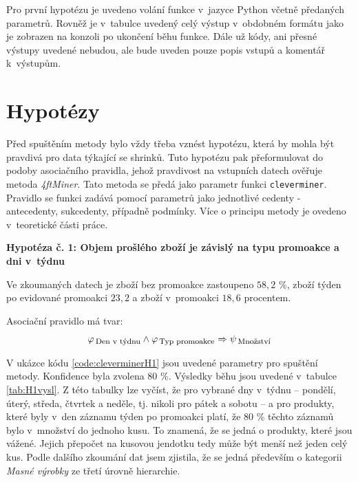 Pro první hypotézu je uvedeno volání funkce v~jazyce Python včetně předaných parametrů. Rovněž je v~tabulce uvedený celý výstup v~obdobném formátu jako je zobrazen na konzoli po ukončení běhu funkce. Dále už kódy, ani přesné výstupy uvedené nebudou, ale bude uveden pouze popis vstupů a komentář k~výstupům. 

\section{Hypotézy}

Před spuštěním metody bylo vždy třeba vznést hypotézu, která by mohla být pravdivá pro data týkající se shrinků. Tuto hypotézu pak přeformulovat do podoby asociačního pravidla, jehož pravdivost  na vstupních datech ověřuje metoda \emph{4ftMiner}. Tato metoda se předá jako parametr funkci \texttt{cleverminer}. Pravidlo se funkci zadává pomocí parametrů jako jednotlivé cedenty - antecedenty, sukcedenty, případně podmínky. Více o principu metody je ovedeno v~teoretické části práce.

\vspace*{1em}

\textbf{Hypotéza č. 1: Objem prošlého zboží je závislý na typu promoakce a dni v~týdnu}

Ve zkoumaných datech je zboží bez promoakce zastoupeno $58{,}2$ \%, zboží týden po evidované promoakci $23{,}2$ a zboží v~promoakci $18{,}6$ procentem. 

Asociační pravidlo má tvar:
\begin{equation}
    \varphi_{\mbox{\,\footnotesize Den v~týdnu}} \land \varphi_{\,\mbox{\footnotesize Typ promoakce}} \Rightarrow \psi_{\mbox{\,\footnotesize Množství}}
\end{equation}

V ukázce kódu \ref*{code:cleverminerH1} jsou uvedené parametry pro spuštění metody. Konfidence byla zvolena 80 \%. Výsledky běhu jsou uvedené v~tabulce \ref*{tab:H1vysl}. Z této tabulky lze vyčíst, že pro vybrané dny v~týdnu -- pondělí, úterý, středa, čtvrtek a neděle, tj. nikoli pro pátek a sobotu -- a pro produkty, které byly v~den záznamu týden po promoakci platí, že 80 \% těchto záznamů bylo v~množství do jednoho kusu. To znamená, že se jedná o produkty, které jsou vážené. Jejich přepočet na kusovou jendotku tedy může být menší než jeden celý kus. Podle dalšího zkoumání dat jsem zjistila, že se jedná především o kategorii \emph{Masné výrobky} ze třetí úrovně hierarchie.


